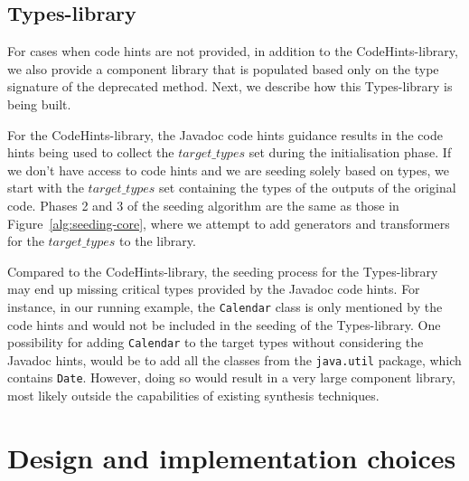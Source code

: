 \documentclass[conference]{IEEEtran}
\newcommand{\targettypes}{\mbox{$\mathit{target\_types}$}\xspace}
\begin{document}
\subsection{Types-library} \label{sec:extend-library}

For cases when code hints are not provided, in addition to the
CodeHints-library, we also provide a component library that is populated
based only on the type signature of the deprecated method.  Next, we
describe how this Types-library is being built.

For the CodeHints-library, the Javadoc code hints guidance results in the code hints being
used to collect the \targettypes set during the initialisation phase.
If we don't have access to code hints and we are seeding solely
based on types, we start with the \targettypes set containing
the types %
of the outputs of the original code. %
Phases 2 and 3 of the seeding algorithm are the same as those in Figure~\ref{alg:seeding-core},
where we attempt to add generators and transformers for the \targettypes to the library.


%
Compared to the CodeHints-library, the seeding process for the Types-library
may end up missing critical types provided by the Javadoc code hints.  For
instance, in our running example, the \lstinline[breaklines=true]{Calendar}
class is only mentioned by the code hints and would not be included in the
seeding of the Types-library.  One possibility for adding
\lstinline[breaklines=true]{Calendar} to the target types without considering
the Javadoc hints, would be to add all the classes from the
\lstinline[breaklines=true]{java.util} package, which contains
\lstinline[breaklines=true]{Date}.  However, doing so would result in a very
large component library, most likely outside the capabilities of existing
synthesis techniques.

\section{Design and implementation choices} \label{sec:implementation}

  
\end{document}
